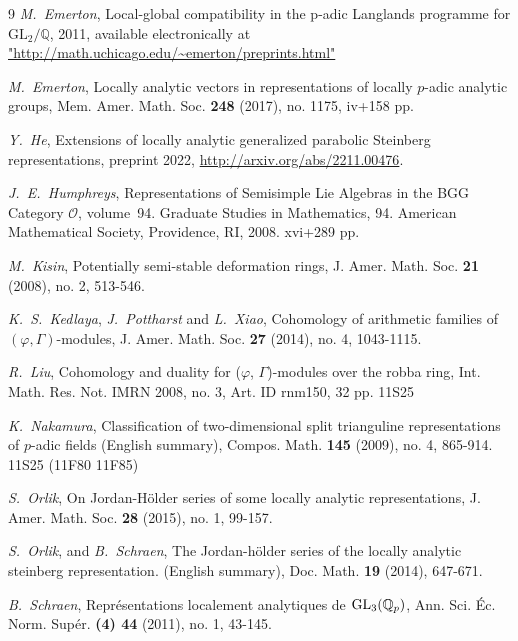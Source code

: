 \documentclass[SecEq,CM,GP]{degruyter-crelle} %
\theoremstyle{plain}
\newcommand{\GLN}{{\rm GL}}
\newcommand{\BQ}{{\mathbb{Q}}}
\newcommand{\cO}{\mathcal O}
\begin{document}
\begin{thebibliography}{9}
\textit{M.~Emerton}, 
Local-global compatibility in the p-adic Langlands programme for $\mathrm{GL}_2/\mathbb{Q}$,
2011, available electronically at \url{"http://math.uchicago.edu/~emerton/preprints.html"} 


\textit{M.~Emerton}, 
 Locally analytic vectors in representations of locally $p$-adic analytic groups,
Mem. Amer. Math. Soc. \textbf{248} (2017), no. 1175, iv+158 pp.  


\textit{Y.~He},
Extensions of locally analytic generalized parabolic Steinberg representations,
preprint 2022, \url{http://arxiv.org/abs/2211.00476}.


\textit{J.~E.~Humphreys}, 
Representations of Semisimple Lie Algebras in the BGG Category $\cO$, volume~94.
Graduate Studies in Mathematics, 94. American Mathematical Society, Providence, RI, 2008. xvi+289 pp. 

\textit{M.~Kisin},
Potentially semi-stable deformation rings, J. Amer. Math. Soc. \textbf{21} (2008), no. 2, 513-546.


\textit{K.~S.~Kedlaya}, \textit{J.~Pottharst} and  \textit{L.~Xiao},
Cohomology of arithmetic families of {$(\varphi,\Gamma)$}-modules, J. Amer. Math. Soc. \textbf{27} (2014), no. 4, 1043-1115.


\textit{R.~Liu},
Cohomology and duality for ($\varphi$, $\Gamma$)-modules over the
robba ring, Int. Math. Res. Not. IMRN 2008, no. 3, Art. ID rnm150, 32 pp. 11S25

\textit{K.~Nakamura},
Classification of two-dimensional split trianguline representations
of $p$-adic fields (English summary), Compos. Math. \textbf{145} (2009), no. 4, 865-914.
11S25 (11F80 11F85)

\textit{S.~Orlik},
On Jordan-H\"{o}lder series of some locally analytic representations,
J. Amer. Math. Soc. \textbf{28} (2015), no. 1, 99-157.


\textit{S.~Orlik}, and \textit{B.~Schraen},
The {J}ordan-h{\"o}lder series of the locally analytic steinberg
representation. (English summary), Doc. Math. \textbf{19} (2014), 647-671.


\textit{B.~Schraen},
Repr\'{e}sentations localement analytiques de {${\GLN}_3(\BQ_p)$}, Ann. Sci. \'{E}c. Norm. Sup\'{e}r. \textbf{(4) 44} (2011), no. 1, 43-145.




\end{thebibliography}
\end{document}
